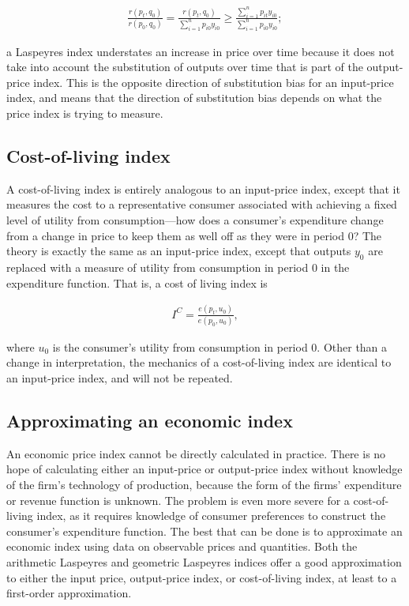 \documentclass[]{article}
\begin{document}
\begin{align*}
\frac{r(p_{t}, q_{0})}{r(p_{0}, q_{0})} = \frac{r(p_{t}, q_{0})}{\sum_{i = 1}^{n} p_{i0} y_{i0}} \geq \frac{\sum_{i = 1}^{n} p_{it} y_{i0}}{\sum_{i = 1}^{n} p_{i0} y_{i0}};
\end{align*}

a Laspeyres index understates an increase in price over time because it does not take into account the substitution of outputs over time that is part of the output-price index. This is the opposite direction of substitution bias for an input-price index, and means that the direction of substitution bias depends on what the price index is trying to measure.

\hypertarget{cost-of-living-index}{%
\subsection{Cost-of-living index}\label{cost-of-living-index}}

A cost-of-living index is entirely analogous to an input-price index, except that it measures the cost to a representative consumer associated with achieving a fixed level of utility from consumption---how does a consumer's expenditure change from a change in price to keep them as well off as they were in period 0? The theory is exactly the same as an input-price index, except that outputs \(y_0\) are replaced with a measure of utility from consumption in period 0 in the expenditure function. That is, a cost of living index is

\begin{align*}
I^{C} = \frac{e(p_{t}, u_{0})}{e(p_{0}, u_{0})},
\end{align*}

where \(u_{0}\) is the consumer's utility from consumption in period 0. Other than a change in interpretation, the mechanics of a cost-of-living index are identical to an input-price index, and will not be repeated.

\hypertarget{approximating-an-economic-index}{%
\subsection{Approximating an economic index}\label{approximating-an-economic-index}}

An economic price index cannot be directly calculated in practice. There is no hope of calculating either an input-price or output-price index without knowledge of the firm's technology of production, because the form of the firms' expenditure or revenue function is unknown. The problem is even more severe for a cost-of-living index, as it requires knowledge of consumer preferences to construct the consumer's expenditure function. The best that can be done is to approximate an economic index using data on observable prices and quantities. Both the arithmetic Laspeyres and geometric Laspeyres indices offer a good approximation to either the input price, output-price index, or cost-of-living index, at least to a first-order approximation.
\end{document}
